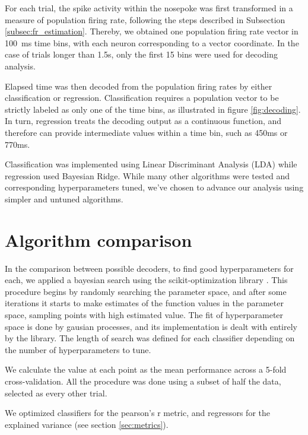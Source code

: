     For each trial, the spike activity within the nosepoke was first transformed in a measure of population firing rate, following the steps described in Subsection \ref{subsec:fr_estimation}. Thereby, we obtained one population firing rate vector in 100~ms time bins, with each neuron corresponding to a vector coordinate. In the case of trials longer than 1.5s, only the first 15 bins were used for decoding analysis. 

    Elapsed time was then decoded from the population firing rates by either classification or regression. Classification requires a population vector to be strictly labeled as only one of the time bins, as illustrated in figure \ref{fig:decoding}. In turn, regression treats the decoding output as a continuous function, and therefore can provide intermediate values within a time bin, such as 450ms or 770ms.

    Classification was implemented using Linear Discriminant Analysis (LDA) while regression used Bayesian Ridge. While many other algorithms were tested and corresponding hyperparameters tuned, we've chosen to advance our analysis using simpler and untuned algorithms. 

\section{Algorithm comparison}
    In the comparison between possible decoders, to find good hyperparameters for each, we applied a bayesian search using the scikit-optimization library \cite{skopt}. This procedure begins by randomly searching the parameter space, and after some iterations it starts to make estimates of the function values in the parameter space, sampling points with high estimated value. The fit of hyperparameter space is done by gausian processes, and its implementation is dealt with entirely by the library. The length of search was defined for each classifier depending on the number of hyperparameters to tune.
    
    We calculate the value at each point as the mean performance across a 5-fold cross-validation. All the procedure was done using a subset of half the data, selected as every other trial.
    
    We optimized classifiers for the pearson's r metric, and regressors for the explained variance (see section \ref{sec:metrics}).
    
